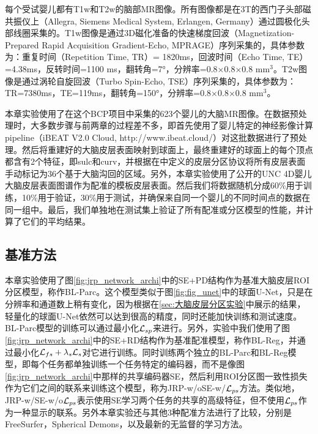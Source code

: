 每个受试婴儿都有T1w和T2w的脑部MR图像。所有图像都是在3T的西门子头部磁共振仪上（Allegra, Siemens Medical System, Erlangen, Germany）通过圆极化头部线圈采集的。T1w图像是通过3D磁化准备的快速梯度回波（Magnetization-Prepared Rapid Acquisition Gradient-Echo, MPRAGE）序列采集的，具体参数为：重复时间（Repetition Time, TR）= 1820ms，回波时间（Echo Time, TE）=4.38ms，反转时间=1100 ms，翻转角=7°，分辨率=0.8×0.8×0.8 mm$^3$。T2w图像是通过涡轮自旋回波（Turbo Spin-Echo, TSE）序列采集的，具体参数为：TR=7380ms，TE=119ms，翻转角=150°，分辨率=0.8×0.8×0.8 mm$^3$。

本章实验使用了在这个BCP项目中采集的623个婴儿的大脑MR图像。在数据预处理时，大多数步骤与前两章的过程差不多，即首先使用了婴儿特定的神经影像计算pipeline（iBEAT V2.0 Cloud, http://www.ibeat.cloud/）\cite{li2019computational}对这批数据进行了预处理。然后将重建好的大脑皮层表面映射到球面上\cite{fischl2012freesurfer}，最终重建好的球面上的每个顶点都含有2个特征，即sulc和curv，并根据在\cite{desikan2006automated}中定义的皮层分区协议将所有皮层表面手动标记为36个基于大脑沟回的区域。另外，本章实验使用了公开的UNC 4D婴儿大脑皮层表面图谱\cite{li2015construction}作为配准的模板皮层表面。然后我们将数据随机分成60\%用于训练，10\%用于验证，30\%用于测试，并确保来自同一个婴儿的不同时间点的数据在同一组中。最后，我们单独地在测试集上验证了所有配准或分区模型的性能，并计算了它们的平均结果。

\subsection{基准方法}
本章实验使用了图\ref{fig:jrp_network_archi}中的SE+PD结构作为基准大脑皮层ROI分区模型，称作BL-Parc。这个模型类似于图\ref{fig:fig_unet}中的球面U-Net，只是在分辨率和通道数上稍有变化，因为根据在\ref{sec:大脑皮层分区实验}中展示的结果，轻量化的球面U-Net依然可以达到很高的精度，同时还能加快训练和测试速度。BL-Parc模型的训练可以通过最小化${\cal L}_{sp}$来进行。另外，实验中我们使用了图\ref{fig:jrp_network_archi}中的SE+RD结构作为基准配准模型，称作BL-Reg，并通过最小化${\cal L}_{fs}+\lambda_s{\cal L}_s$对它进行训练。同时训练两个独立的BL-Parc和BL-Reg模型，即每个任务都单独训练一个任务特定的编码器，而不是像图\ref{fig:jrp_network_archi}中那样的共享编码器SE，然后利用ROI分区图一致性损失作为它们之间的联系来训练这个模型，称为JRP-w/oSE-w/${\cal L}_{ps}$方法。类似地，JRP-w/SE-w/o${\cal L}_{ps}$表示使用SE学习两个任务的共享的高级特征，但不使用${\cal L}_{ps}$作为一种显示的联系。另外本章实验还与其他3种配准方法进行了比较，分别是FreeSurfer\cite{fischl1999high}，Spherical Demons\cite{yeo2009spherical}，以及最新的无监督的学习方法\cite{zhao2020unsupervised}。

